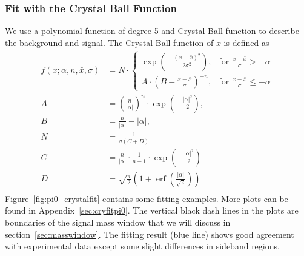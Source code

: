 \subsubsection{Fit with the Crystal Ball Function}
\label{sec:crystalBallFit}
We use a polynomial function of degree 5 and Crystal Ball function to describe the background and signal. The Crystal Ball function of $x$ is defined as~\cite{CrystalBallFunc}
\begin{subequations}
\begin{align}
f(x;\alpha,n,\bar x,\sigma) & = N \cdot \begin{cases} \exp(- \frac{(x - \bar x)^2}{2 \sigma^2}), & \mbox{for }\frac{x - \bar x}{\sigma} > -\alpha \\
 A \cdot (B - \frac{x - \bar x}{\sigma})^{-n}, & \mbox{for }\frac{x - \bar x}{\sigma} \leqslant -\alpha \end{cases}\\
A & = \left(\frac{n}{\left| \alpha \right|}\right)^n \cdot \exp\left(- \frac {\left| \alpha \right|^2}{2}\right), \\
B &= \frac{n}{\left| \alpha \right|}  - \left| \alpha \right|,\\
N &= \frac{1}{\sigma (C + D)}\\
C &= \frac{n}{\left| \alpha \right|} \cdot \frac{1}{n-1} \cdot \exp\left(- \frac {\left| \alpha \right|^2}{2}\right) \\
D &= \sqrt{\frac{\pi}{2}} \left(1 + \operatorname{erf}\left(\frac{\left| \alpha \right|}{\sqrt 2}\right)\right) \\
\end{align}
\label{eqn:crystalball}
\end{subequations}
Figure~\ref{fig:pi0_crystalfit} contains some fitting examples. More plots can be found in Appendix~\ref{sec:cryfitpi0}. 
  The vertical black dash lines in the plots are boundaries of the signal mass window that we will discuss in section~\ref{sec:masswindow}. The fitting result (blue line) shows good agreement with experimental data except some slight differences in sideband regions. 
